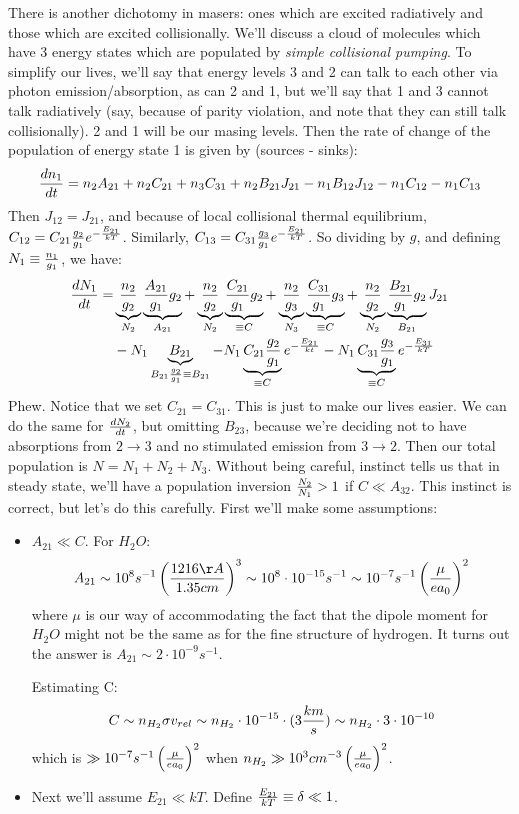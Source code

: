 \documentclass[11pt]{article}
\def\ato{{A_{21}}}
\def\bto{{B_{21}}}
\def\bot{{B_{12}}}
\def\e#1{\cdot10^{#1}}
\begin{document}
There is another dichotomy in masers: ones which are excited radiatively and
those which are excited collisionally.  We'll discuss a cloud of molecules
which have 3 energy states which are populated by {\it simple collisional
pumping}.  To simplify our lives, we'll say that energy levels 3 and 2 can
talk to each other via photon emission/absorption, as can 2 and 1, but we'll
say that 1 and 3 cannot talk radiatively (say, because of parity violation, and
note that they can still talk collisionally).  2 and 1 will be
our masing levels.  Then the rate of change of the population of energy state
1 is given by (sources - sinks):
$${dn_1\over dt}=n_2\ato+n_2C_{21}+n_3C_{31}+n_2\bto J_{21}-n_1\bot J_{12}
-n_1C_{12}-n_1C_{13}$$
Then $J_{12}=J_{21}$, and because of local collisional thermal equilibrium,
$C_{12}=C_{21}{g_2\over g_1}e^{-{E_{21}\over kT}}$.  Similarly,
$C_{13}=C_{31}{g_3\over g_1}e^{-{E_{21}\over kT}}$.  So dividing by $g$, and
defining $N_1\equiv{n_1\over g_1}$, we have:
$$\begin{aligned}{dN_1\over dt}=&\underbrace{n_2\over g_2}_{N_2}\underbrace{
{\ato\over g_1}g_2}_{\ato}+\underbrace{n_2\over g_2}_{N_2}\underbrace{
{C_{21}\over g_1}g_2}_{\equiv C}+\underbrace{n_2\over g_3}_{N_3}\underbrace{
{C_{31}\over g_1}g_3}_{\equiv C}+\underbrace{n_2\over g_2}_{N_2}\underbrace{
{\bto\over g_1}g_2}_{\bto}J_{21}\\
&-N_1\underbrace{\bto}_{\bto{g_2\over g_1}\equiv
\bto}-N_1\underbrace{C_{21}{g_2\over g_1}}_{\equiv C}e^{-{E_{21}\over kt}}-
N_1\underbrace{C_{31}{g_3\over g_1}}_{\equiv C}e^{-{E_{31}\over kT}}\\
\end{aligned}$$
Phew.  Notice that we set $C_{21}=C_{31}$.  This is just to make our lives
easier.  We can do the same for $dN_2\over dt$, but omitting $B_{23}$, because
we're deciding not to have absorptions from $2\to3$ and no stimulated emission
from $3\to2$.  Then our total population is $N=N_1+N_2+N_3$.  Without being
careful, instinct tells us that in steady state, we'll have a population
inversion ${N_2\over N_1}>1$ if $C\ll A_{32}$.  This
instinct is correct, but let's do this carefully.  First we'll make some
assumptions:
\begin{itemize}\item $\ato\ll C$.  For $H_2O$: 
$$\ato\sim10^8s^{-1}\left({1216\AA\over1.35cm}\right)^3
\sim10^8\e{-15}s^{-1}
\sim10^{-7}s^{-1}\left({\mu\over ea_0}\right)^2$$
where $\mu$ is our way of accommodating the fact that the dipole moment for
$H_2O$ might not be the same as for the fine structure of hydrogen.  It turns
out the answer is $\ato\sim2\e{-9}s^{-1}$.\par
Estimating C:
$$C\sim n_{H_2}\sigma v_{rel}\sim n_{H_2}\e{-15}\cdot(3{km\over s})
\sim n_{H_2}\cdot3\e{-10}$$
which is $\gg10^{-7}s^{-1}\left({\mu\over ea_0}\right)^2$ when
$n_{H_2}\gg10^3cm^{-3}\left({\mu\over ea_0}\right)^2$.  
\item Next we'll assume $E_{21}\ll kT$.  Define ${E_{21}\over kT}\equiv\delta
\ll1$.\end{itemize}
\end{document}
